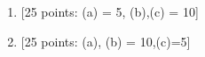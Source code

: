 \documentclass[11pt]{article}
\begin{document}
\newpage
\setcounter{page}{1}
\begin{enumerate}

\item {[25 points: (a) = 5, (b),(c) = 10]}
\vspace*{.5em}


\newpage
\item {[25 points: (a), (b) = 10,(c)=5]}
\vspace*{.5em}


%

%
%

%
%


%

\end{enumerate}
\end{document}
